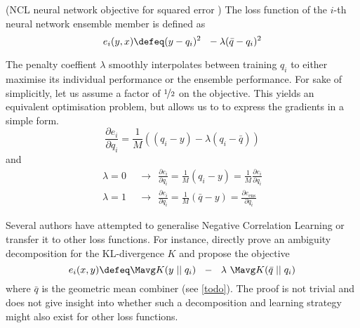 \documentclass[../main.tex]{subfiles}
\begin{document}
\begin{definition} (NCL neural network objective for squared error \cite{brown_ManagingDiversityRegression_2005}) The loss function of the $i$-th neural network ensemble member is defined as
$$
e_{i}(y,x) \defeq (y - q_i)^2 ~ ~ - \lambda (\bar{q} - q_i)^2
$$
\end{definition}
The penalty coeffient $\lambda$ smoothly interpolates between training $q_{i}$ to either maximise its individual performance or the ensemble performance. For sake of simplicitly, let us assume a factor of $\nicefrac{1}{2}$ on the objective. This yields an equivalent optimisation problem, but allows us to to express the gradients in a simple form.
$$
\frac{\partial e_{i}}{\partial q_{i}} = \frac{1}{M}
\left(
(q_{i}-y) - \lambda (q_{i} - \bar{q})
\right)
$$
and
$$
\begin{align}
\lambda = 0 ~~&\rightarrow~~ \frac{\partial e_{i}}{\partial q_{i}} = \frac{1}{M}(q_{i}-y) = \frac{1}{M} \frac{\partial e_{i}}{\partial q_{i}} \\
\lambda = 1 ~~&\rightarrow~~ \frac{\partial e_{i}}{\partial q_{i}} = \frac{1}{M}(\bar{q} - y) = \frac{\partial e_{\text{ens}}}{\partial q_{i}}
\end{align}
$$

Several authors have attempted to generalise Negative Correlation Learning or transfer it to other loss functions. For instance, \cite{webb21} directly prove an ambiguity decomposition for the KL-divergence $K$ and propose the objective
$$
e_{i}(x,y) \defeq \Mavg K(y \mid\mid q_{i}) ~ ~ - ~ ~ \lambda ~ \Mavg K(\bar{q} \mid\mid q_{i})
$$
where $\bar{q}$ is the geometric mean combiner (see \ref{todo}). The proof is not trivial and does not give insight into whether such a decomposition and learning strategy might also exist for other loss functions.
\end{document}
